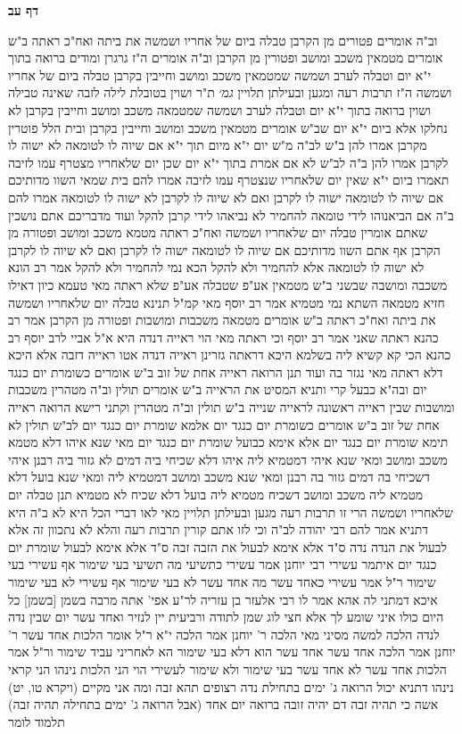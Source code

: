 \documentclass[12pt, openany]{book}
\newcommand{\sethebfont}{
\fontsize{10.5pt}{21.0pt} \selectfont
}
\newcommand{\twocol}[1]{
	{\sethebfont \begin{multicols}{2}
			#1
	\end{multicols}}	
}
\newcommand{\sectname}{}
\newcommand{\newsection}[1]{
	\addcontentsline{toc}{section}{#1}
	\renewcommand{\sectname}{#1}	
	\vspace{-\baselineskip}
	\begin{center}
		\textbf{%
\fontsize{16pt}{16pt}\selectfont
			#1}
	\end{center}
	\vspace{-\baselineskip}
	\nopagebreak
}
\begin{document}
\newsection{דף עב}
\twocol{וב"ה אומרים  פטורים מן הקרבן 
טבלה ביום של אחריו ושמשה את ביתה ואח"כ ראתה ב"ש אומרים  מטמאין משכב ומושב ופטורין מן הקרבן 
וב"ה אומרים  ה"ז גרגרן  ומודים ברואה בתוך י"א יום וטבלה לערב ושמשה שמטמאין משכב ומושב  וחייבין בקרבן 
טבלה ביום של אחריו ושמשה ה"ז תרבות רעה ומגען ובעילתן תלויין
{\large\emph{גמ׳}} ת"ר ושוין בטובלת לילה לזבה שאינה טבילה  ושוין ברואה בתוך י"א יום וטבלה לערב ושמשה שמטמאה משכב ומושב וחייבין בקרבן 
לא נחלקו אלא ביום י"א יום שב"ש אומרים  מטמאין משכב ומושב וחייבין בקרבן  ובית הלל פוטרין מקרבן 
אמרו להן ב"ש לב"ה  מ"ש יום י"א מיום תוך י"א  אם שיוה לו לטומאה לא ישוה לו לקרבן 
אמרו להן ב"ה לב"ש  לא אם אמרת בתוך י"א יום שכן יום שלאחריו מצטרף עמו לזיבה תאמרו ביום י"א שאין יום שלאחריו שנצטרף עמו לזיבה 
אמרו להם בית שמאי  השוו מדותיכם אם שיוה לו לטומאה ישוה לו לקרבן ואם לא שיוה לו לקרבן לא ישוה לו לטומאה 
אמרו להם ב"ה  אם הביאנוהו לידי טומאה להחמיר לא נביאהו לידי קרבן להקל 
ועוד מדבריכם אתם נושכין שאתם אומרין טבלה יום שלאחריו ושמשה ואח"כ ראתה מטמא משכב ומושב ופטורה מן הקרבן אף אתם השוו מדותיכם אם שיוה לו לטומאה ישוה לו לקרבן
ואם לא שיוה לו לקרבן לא ישוה לו לטומאה  אלא להחמיר ולא להקל הכא נמי להחמיר ולא להקל 
אמר רב הונא  משכבה ומושבה שבשני ב"ש מטמאין אע"פ שטבלה אע"פ שלא ראתה  מאי טעמא  כיון דאילו חזיא מטמאה השתא נמי מטמיא 
אמר רב יוסף  מאי קמ"ל  תנינא  טבלה יום שלאחריו ושמשה את ביתה ואח"כ ראתה  ב"ש אומרים  מטמאה משכבות ומושבות ופטורה מן הקרבן 
אמר רב כהנא  ראתה שאני 
אמר רב יוסף  וכי ראתה מאי הוי  ראייה דנדה היא 
א"ל אביי לרב יוסף  רב כהנא הכי קא קשיא ליה בשלמא היכא דראתה גזרינן ראייה דנדה אטו ראייה דזבה אלא היכא דלא ראתה מאי נגזר בה 
ועוד  תנן הרואה ראייה אחת של זוב ב"ש אומרים  כשומרת יום כנגד יום ובה"א  כבעל קרי
ותניא המסיט את הראייה ב"ש אומרים  תולין וב"ה מטהרין 
משכבות ומושבות שבין ראייה ראשונה לראייה שנייה ב"ש תולין וב"ה מטהרין 
וקתני רישא  הרואה ראייה אחת של זוב ב"ש אומרים  כשומרת יום כנגד יום  אלמא  שומרת יום כנגד יום לב"ש תולין 
לא תימא שומרת יום כנגד יום אלא אימא כבועל שומרת יום כנגד יום 
מאי שנא איהו דלא מטמא משכב ומושב ומאי שנא איהי דמטמיא ליה 
איהו דלא שכיחי ביה דמים לא גזור ביה רבנן איהי דשכיחי בה דמים גזור בה רבנן 
ומאי שנא משכב ומושב דמטמיא ליה ומאי שנא בועל דלא מטמיא ליה 
משכב ומושב דשכיח מטמיא ליה בועל דלא שכיח לא מטמיא 
תנן  טבלה יום שלאחריו ושמשה הרי זו תרבות רעה
מגען ובעילתן תלויין  מאי לאו דברי הכל היא 
לא ב"ה היא  דתניא אמר להם רבי יהודה לב"ה  וכי לזו אתם קורין תרבות רעה  והלא לא נתכוון זה אלא לבעול את הנדה  נדה ס"ד 
אלא אימא לבעול את הזבה זבה ס"ד  אלא אימא לבעול שומרת יום כנגד יום 
איתמר  עשירי רבי יוחנן אמר  עשירי כתשיעי מה תשיעי בעי שימור אף עשירי בעי שימור 
ר"ל אמר  עשירי כאחד עשר מה אחד עשר לא בעי שימור אף עשירי לא בעי שימור 
איכא דמתני לה אהא אמר לו רבי אלעזר בן עזריה לר"ע  אפי' אתה מרבה בשמן [בשמן] כל היום כולו איני שומע לך  אלא חצי לוג שמן לתודה ורביעית יין לנזיר ואחד עשר יום שבין נדה לנדה הלכה למשה מסיני 
מאי הלכה  ר' יוחנן אמר  הלכה י"א  ר"ל אומר  הלכות אחד עשר 
ר' יוחנן אמר  הלכה אחד עשר אחד עשר הוא דלא בעי שימור הא לאחריני עביד שימור  ור"ל אמר  הלכות אחד עשר לא אחד עשר בעי שימור ולא שימור לעשירי הוי 
הני הלכות נינהו  הני קראי נינהו  דתניא  יכול הרואה ג' ימים בתחילת נדה רצופים  תהא זבה 
ומה אני מקיים (ויקרא טו, יט) אשה כי תהיה זבה דם יהיה זובה ברואה יום אחד (אבל הרואה ג' ימים בתחילה תהיה זבה)  תלמוד לומר}
\end{document}
